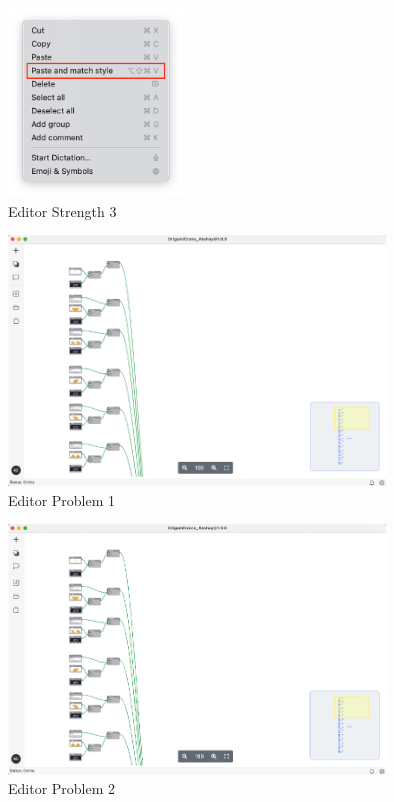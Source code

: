 \documentclass[conference,onecolumn]{IEEEtran}
\begin{document}
    \begin{figure}[H]
        \centerline{\includegraphics[height=50mm,scale=1]{./images/Editor_Strength_3.png}}
        \caption{Editor Strength 3}
        \label{Editor Strength 3}
    \end{figure}
    \begin{figure}[H]
        \centerline{\includegraphics[width=100mm,scale=1]{./images/Editor_Problem_1.png}}
        \caption{Editor Problem 1}
        \label{Editor Problem 1}
    \end{figure}   
    \begin{figure}[H]
        \centerline{\includegraphics[width=100mm,scale=1]{./images/Editor_Problem_2.png}}
        \caption{Editor Problem 2}
        \label{Editor Problem 2}
    \end{figure}   
\end{document}
